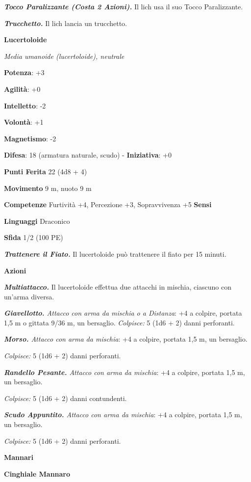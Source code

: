 \begin{multicols}{2}
\emph{\textbf{Tocco Paralizzante (Costa 2 Azioni).}} Il lich usa il suo
Tocco Paralizzante.

\emph{\textbf{Trucchetto.}} Il lich lancia un trucchetto.

\textbf{Lucertoloide}

\emph{Media umanoide (lucertoloide), neutrale}

\textbf{Potenza}: +3

\textbf{Agilità}: +0

\textbf{Intelletto}: -2

\textbf{Volontà}: +1

\textbf{Magnetismo}: -2

\textbf{Difesa}: 18 (armatura naturale, scudo) - \textbf{Iniziativa}: +0

\textbf{Punti Ferita} 22 (4d8 + 4)

\textbf{Movimento} 9 m, nuoto 9 m

\textbf{Competenze} Furtività +4, Percezione +3, Sopravvivenza +5
\textbf{Sensi} 

\textbf{Linguaggi} Draconico

\textbf{Sfida} 1/2 (100 PE)

\emph{\textbf{Trattenere il Fiato.}} Il lucertoloide può trattenere il
fiato per 15 minuti.

\textbf{Azioni}

\emph{\textbf{Multiattacco.}} Il lucertoloide effettua due attacchi in
mischia, ciascuno con un'arma diversa.

\emph{\textbf{Giavellotto.} Attacco con arma da mischia o a Distanza}:
+4 a colpire, portata 1,5 m o gittata 9/36 m, un bersaglio.
\emph{Colpisce:} 5 (1d6 + 2) danni perforanti.

\emph{\textbf{Morso.} Attacco con arma da mischia}: +4 a colpire,
portata 1,5 m, un bersaglio.

\emph{Colpisce:} 5 (1d6 + 2) danni perforanti.

\emph{\textbf{Randello Pesante.} Attacco con arma da mischia}: +4 a
colpire, portata 1,5 m, un bersaglio.

\emph{Colpisce:} 5 (1d6 + 2) danni contundenti.

\emph{\textbf{Scudo Appuntito.} Attacco con arma da mischia}: +4 a
colpire, portata 1,5 m, un bersaglio.

\emph{Colpisce:} 5 (1d6 + 2) danni perforanti.



\textbf{Mannari}

\textbf{Cinghiale Mannaro}


\end{multicols}
